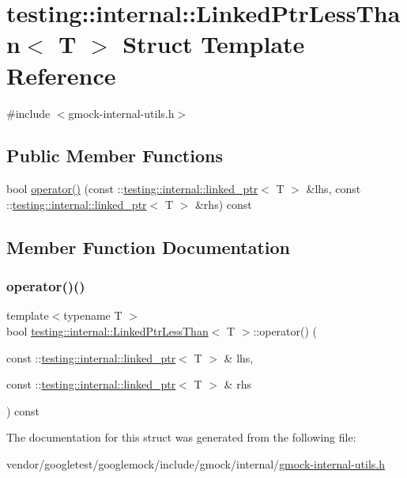 \hypertarget{structtesting_1_1internal_1_1_linked_ptr_less_than}{}\section{testing\+:\+:internal\+:\+:Linked\+Ptr\+Less\+Than$<$ T $>$ Struct Template Reference}
\label{structtesting_1_1internal_1_1_linked_ptr_less_than}


{\ttfamily \#include $<$gmock-\/internal-\/utils.\+h$>$}

\subsection*{Public Member Functions}
\begin{DoxyCompactItemize}
\item 
bool \hyperlink{structtesting_1_1internal_1_1_linked_ptr_less_than_a0614293c43e51b280a870ab117355164}{operator()} (const \+::\hyperlink{classtesting_1_1internal_1_1linked__ptr}{testing\+::internal\+::linked\+\_\+ptr}$<$ T $>$ \&lhs, const \+::\hyperlink{classtesting_1_1internal_1_1linked__ptr}{testing\+::internal\+::linked\+\_\+ptr}$<$ T $>$ \&rhs) const
\end{DoxyCompactItemize}


\subsection{Member Function Documentation}
\mbox{\label{structtesting_1_1internal_1_1_linked_ptr_less_than_a0614293c43e51b280a870ab117355164}} 
\subsubsection{\texorpdfstring{operator()()}{operator()()}}
{\footnotesize\ttfamily template$<$typename T $>$ \\
bool \hyperlink{structtesting_1_1internal_1_1_linked_ptr_less_than}{testing\+::internal\+::\+Linked\+Ptr\+Less\+Than}$<$ T $>$\+::operator() (\begin{DoxyParamCaption}\item[{const \+::\hyperlink{classtesting_1_1internal_1_1linked__ptr}{testing\+::internal\+::linked\+\_\+ptr}$<$ T $>$ \&}]{lhs,  }\item[{const \+::\hyperlink{classtesting_1_1internal_1_1linked__ptr}{testing\+::internal\+::linked\+\_\+ptr}$<$ T $>$ \&}]{rhs }\end{DoxyParamCaption}) const\hspace{0.3cm}{\ttfamily [inline]}}



The documentation for this struct was generated from the following file\+:\begin{DoxyCompactItemize}
\item 
vendor/googletest/googlemock/include/gmock/internal/\hyperlink{gmock-internal-utils_8h}{gmock-\/internal-\/utils.\+h}\end{DoxyCompactItemize}
